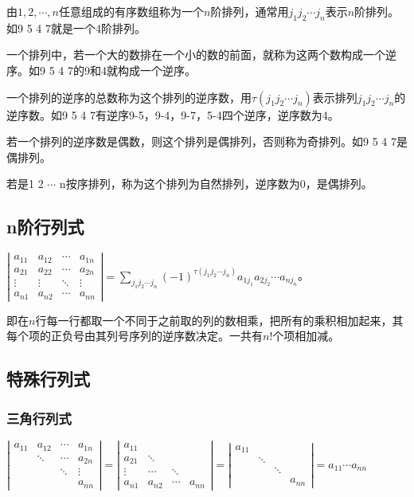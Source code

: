 \documentclass[UTF8, 12pt]{ctexart}
\begin{document}
由$1,2,\cdots,n$任意组成的有序数组称为一个$n$阶排列，通常用$j_1j_2\cdots j_n$表示$n$阶排列。如9 5 4 7就是一个4阶排列。

一个排列中，若一个大的数排在一个小的数的前面，就称为这两个数构成一个逆序。如9 5 4 7的9和4就构成一个逆序。

一个排列的逆序的总数称为这个排列的逆序数，用$\tau(j_1j_2\cdots j_n)$表示排列$j_1j_2\cdots j_n$的逆序数。如9 5 4 7有逆序9-5，9-4，9-7，5-4四个逆序，逆序数为4。

若一个排列的逆序数是偶数，则这个排列是偶排列，否则称为奇排列。如9 5 4 7是偶排列。

若是1 2 $\cdots$ n按序排列，称为这个排列为自然排列，逆序数为0，是偶排列。

\subsection{n阶行列式}

$
\left|\begin{array}{cccc} 
    a_{11} & a_{12} & \cdots & a_{1n} \\
    a_{21} & a_{22} & \cdots & a_{2n} \\
    \vdots & \vdots & \ddots & \vdots \\
    a_{n1} & a_{n2} & \cdots & a_{nn}
\end{array}\right| 
=\sum\limits_{j_1j_2\cdots j_n}(-1)^{\tau(j_1j_2\cdots j_n)}a_{1j_1}a_{2j_2}\cdots a_{nj_n}$。

即在$n$行每一行都取一个不同于之前取的列的数相乘，把所有的乘积相加起来，其每个项的正负号由其列号序列的逆序数决定。一共有$n!$个项相加减。

\subsection{特殊行列式}

\subsubsection{三角行列式}

$\left|\begin{array}{cccc} 
    a_{11} & a_{12} & \cdots & a_{1n} \\
     & \ddots & \cdots & a_{2n} \\
     & & \ddots & \vdots  \\
     & & & a_{nn}
\end{array}\right|=
\left|\begin{array}{cccc} 
    a_{11} & & & \\
    a_{21} & \ddots & & \\
    \vdots & \cdots & \ddots &  \\
    a_{n1} & a_{n2} & \cdots & a_{nn}
\end{array}\right|=
\left|\begin{array}{cccc} 
    a_{11} & & & \\
     & \ddots & & \\
     & & \ddots &  \\
     & & & a_{nn}
\end{array}\right|=a_{11}\cdots a_{nn}$
\end{document}
